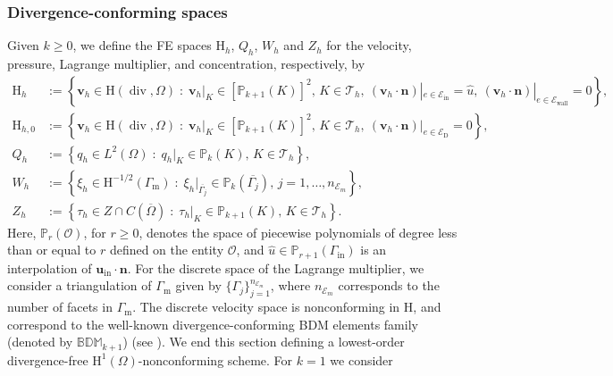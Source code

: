 \documentclass[onefignum,onetabnum,reqno,a4paper,final]{siamart250211}
\def\O{\Omega}
\newcommand\bv{\boldsymbol{v}}
\newcommand\bn{\boldsymbol{n}}
\newcommand\0{\mathbf{0}}
\newcommand\CE{\mathcal{E}}
\def\CT{{\mathcal T}}
\renewcommand\H{\mathrm{H}}
\newcommand\bH{\boldsymbol{\mathrm{H}}}
\renewcommand\O{\Omega}
\newcommand\Gm{\Gamma_{\mathrm{m}}}
\newcommand\Gi{\Gamma_{\mathrm{in}}}
\renewcommand\div{\mathop{\mathrm{div}}\nolimits}
\newcommand\buin{\boldsymbol{u}_{\mathrm{in}}}
\numberwithin{figure}{section}
\numberwithin{table}{section}
\begin{document}
	\subsubsection{Divergence-conforming spaces}\label{subsec:Div-free-BDM}
	Given $k\geq0$, we define the FE spaces $\bH_h$, $Q_h$, $W_h$ and $Z_h$ for the velocity, pressure, Lagrange multiplier, and concentration, respectively, by
	\[
	\begin{aligned}
		\bH_h& :=\left\{\bv_h\in \H(\div,\O)\;:\; \bv_h\vert_K\in[\mathbb{P}_{k+1}(K)]^2,\,K\in\CT_h ,%
		\ (\bv_h\cdot \bn)|_{e\in\CE_{\mathrm{in}}} = \widehat{u},\ (\bv_h\cdot \bn)|_{e\in\CE_{\mathrm{wall}}} = 0 \right\},\\
        \bH_{h,0}& :=\left\{\bv_h\in \H(\div,\O)\;:\; \bv_h\vert_K\in[\mathbb{P}_{k+1}(K)]^2,\,K\in\CT_h ,{ \ (\bv_h\cdot \bn)|_{e\in\CE_{\mathrm{D}}} =  0} \right\},\\
		Q_h &:=\left\{q_h\in L^2(\Omega)\;:\; q_h\vert_K\in\mathbb{P}_k(K),\,K\in\CT_h \right\},\\
		W_h &:=\left\{\xi_h\in {\H^{-1/2}(\Gm)} %
		\;:\; \xi_h\vert_{\overline{\Gamma_j}}\in\mathbb{P}_k(\overline{\Gamma_j}),\, j=1,\ldots,n_{\mathcal{E}_m} \right\},\\
		Z_h & :=\left\{\tau_h\in Z\cap C(\overline{\O})\;:\; \tau_h\vert_K\in\mathbb{P}_{k+1}(K),\,K\in\CT_h \right\}.
	\end{aligned}\]
	Here, $\mathbb{P}_r(\mathcal{O})$, for $r\geq0$, denotes the space of piecewise polynomials of degree less than or equal to $r$ defined on the entity $\mathcal{O}$, and $\widehat{u}\in\mathbb{P}_{r+1}(\Gi)$ is an interpolation of $\buin\cdot\bn$.
	For the discrete space of the Lagrange multiplier, we consider a triangulation of $\Gm$ given by $\{\Gamma_j\}_{j=1}^{n_{\mathcal{E}_m}}$, where $n_{\mathcal{E}_m}$ corresponds to the number of facets in $\Gm$.  The discrete velocity space is nonconforming in $\bH$, and correspond to the well-known divergence-conforming BDM elements family (denoted by $\mathbb{BDM}_{k+1}$) (see \cite{brezzi1991variational}). 
We end this section defining a lowest-order divergence-free $\bH^1(\Omega)$-nonconforming scheme. For $k=1$ we consider 
\end{document}
